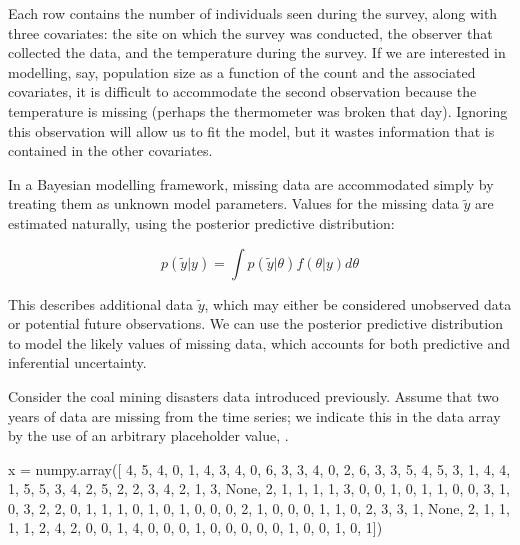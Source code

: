 \documentclass[]{jss}
\begin{document}
Each row contains the number of individuals seen during the survey, along with three covariates: the site on which the survey was conducted, the observer that collected the data, and the temperature during the survey. If we are interested in modelling, say, population size as a function of the count and the associated covariates, it is difficult to accommodate the second observation because the temperature is missing (perhaps the thermometer was broken that day). Ignoring this observation will allow us to fit the model, but it wastes information that is contained in the other covariates.

In a Bayesian modelling framework, missing data are accommodated simply by treating them as unknown model parameters. Values for the missing data $\tilde{y}$ are estimated naturally, using the posterior predictive distribution:

\begin{equation}
  p(\tilde{y}|y) = \int p(\tilde{y}|\theta) f(\theta|y) d\theta
\end{equation}

This describes additional data $\tilde{y}$, which may either be considered unobserved data or potential future observations. We can use the posterior predictive distribution to model the likely values of missing data, which accounts for both predictive and inferential uncertainty.

Consider the coal mining disasters data introduced previously. Assume that two years of data are missing from the time series; we indicate this in the data array by the use of an arbitrary placeholder value, .

\begin{CodeInput}
x = numpy.array([ 4, 5, 4, 0, 1, 4, 3, 4, 0, 6, 3, 3, 4, 0, 2, 6,
3, 3, 5, 4, 5, 3, 1, 4, 4, 1, 5, 5, 3, 4, 2, 5,
2, 2, 3, 4, 2, 1, 3, None, 2, 1, 1, 1, 1, 3, 0, 0,
1, 0, 1, 1, 0, 0, 3, 1, 0, 3, 2, 2, 0, 1, 1, 1,
0, 1, 0, 1, 0, 0, 0, 2, 1, 0, 0, 0, 1, 1, 0, 2,
3, 3, 1, None, 2, 1, 1, 1, 1, 2, 4, 2, 0, 0, 1, 4,
0, 0, 0, 1, 0, 0, 0, 0, 0, 1, 0, 0, 1, 0, 1])
\end{CodeInput}
\end{document}
